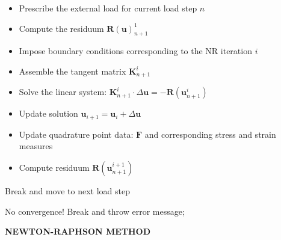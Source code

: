 \documentclass[11pt,a4paper,final]{article}
\begin{document}
\begin{algorithm}[H]
\BlankLine
{}
{
	\begin{itemize}
	\item Prescribe the external load for current load step $n$\;
	\item Compute the residuum $\mathbf{R}(\mathbf{u})^1_{n+1}$\;
	\end{itemize}

	{
		{
		\begin{itemize}
		\item Impose boundary conditions corresponding to the NR iteration $i$\;
		\item Assemble the tangent matrix $\mathbf{K}^{i}_{n+1}$\;
		\item Solve the linear system: $\mathbf{K}^{i}_{n+1} \cdot \Delta\mathbf{u} = -\mathbf{R}(\mathbf{u}^i_{n+1})$\;
		\item Update solution $\mathbf{u}_{i+1} = \mathbf{u}_i + \Delta\mathbf{u}$\;
		\item Update quadrature point data: $\mathbf{F}$ and corresponding stress and strain measures\;
		\item Compute residuum $\mathbf{R}(\mathbf{u}^{i+1}_{n+1})$\;
		\end{itemize}
		}
		{Break and move to next load step\;}			
	}
	{No convergence! Break and throw error message;}
}
\caption{\textbf{NEWTON-RAPHSON METHOD}}
\label{alg:1}
\end{algorithm} \par
\end{document}
